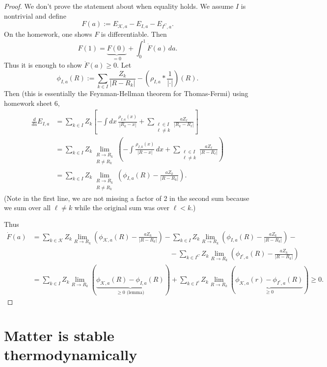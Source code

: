 \documentclass[11pt]{amsart}
\newcommand{\R}{\mathbb{R}}
\theoremstyle{definition}
\theoremstyle{definition}
\theoremstyle{definition}
\numberwithin{equation}{section}
\begin{document}
\begin{proof}
We don't prove the statement about when equality holds. We assume $I$ is nontrivial and define
\[
F(a):=E_{\mathcal{K},a}-E_{I,a}-E_{I^C,a}.
\]
On the homework, one shows $F$ is differentiable. Then
\[
F(1)=\underbrace{F(0)}_{=0}+\int_0^1\dot{F}(a)\,da.
\]
Thus it is enough to show $\dot{F}(a)\ge0$. Let 
\[
\phi_{I,a}(R):=\sum_{k\in I}\frac{Z_k}{|R-R_k|}-(\rho_{I,a}*\frac{1}{|\cdot|})(R).
\]
Then (this is essentially the Feynman-Hellman theorem for Thomas-Fermi) using homework sheet 6,
\begin{align*}
\frac{d}{da}E_{I,a}&=\sum_{k\in I}Z_k\left[-\int dx\,\frac{\rho_{I,a}(x)}{|R_k-x|}+\sum_{\substack{\ell\in I\\\ell\ne k}}\frac{aZ_\ell}{|R_k-R_\ell|}\right]\\
&=\sum_{k\in I}Z_k\lim_{\substack{R\to R_k\\R\ne R_k}}\left(-\int\frac{\rho_{I,k}(x)}{|R-x|}\,dx+\sum_{\substack{\ell\in I\\\ell\ne k}}\frac{aZ_\ell}{|R-R_\ell|}\right)\\
&=\sum_{k\in I}Z_k\lim_{\substack{R\to R_k\\R\ne R_k}}\left(\phi_{I,a}(R)-\frac{a Z_k}{|R-R_k|}\right).
\end{align*}
(Note in the first line, we are not missing a factor of 2 in the second sum because we sum over all $\ell\ne k$ while the original sum was over $\ell<k$.)

Thus
\begin{align*}
\dot{F}(a)&=\sum_{k\in\mathcal{K}}Z_k\lim_{R\to R_k}\left(\phi_{\mathcal{K},a}(R)-\frac{aZ_k}{|R-R_k|}\right)-\sum_{k\in I}Z_k\lim_{R\to R_k}\left(\phi_{I,a}(R)-\frac{aZ_k}{|R-R_k|}\right)-\\
&\qquad\qquad\qquad\qquad\qquad\qquad\qquad\qquad\qquad\qquad -\sum_{k\in I^C}Z_k\lim_{R\to R_k}\left(\phi_{I^c,a}(R)-\frac{aZ_k}{|R-R_k|}\right)\\
&=\sum_{k\in I}Z_k\lim_{R\to R_k}(\underbrace{\phi_{\mathcal{K},a}(R)-\phi_{I,a}(R)}_{\ge0\text{ (lemma)}})+\sum_{k\in I^c}Z_k\lim_{R\to R_k}(\underbrace{\phi_{\mathcal{K},a}(r)-\phi_{I^c,a}(R)}_{\ge0})\ge0.
\end{align*}


\end{proof}


\section{Matter is stable thermodynamically}
\end{document}
